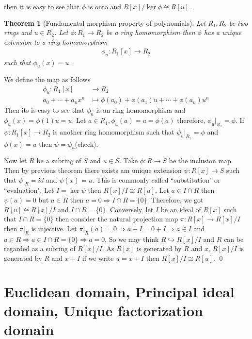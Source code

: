 \documentclass[11pt]{amsart}
\newtheorem{theorem}{Theorem}[section]
\begin{document}
then it is easy to see that $\phi$ is onto and $R[x]/\ker \phi\cong R[u].$ 
\begin{theorem}[Fundamental morphism property of polynomials]
Let $R_1,R_2$ be two rings and $u\in R_2$. Let $\phi:R_1\to R_2$ be a ring homomorphism then $\phi$ has a unique extension to a ring homomorphism \begin{align*}
\phi_u:R_1[x]\to R_2
\end{align*} such that $\phi_u(x)=u.$
\end{theorem}
\proof We define the map as follows \begin{align*}
\phi_u:R_1[x]&\to R_2\\
a_0+\cdots+a_nx^n&\mapsto \phi(a_0)+\phi(a_1)u+\cdots+\phi(a_n)u^n
\end{align*}
Then its is easy to see that $\phi_u$ is an ring homomorphism and $\phi_u(x)=\phi(1)u=u.$ Let $a\in R_1,\phi_u(a)=a=\phi(a)$ therefore, $\phi_u\big|_{R_1}=\phi.$ If $\psi:R_1[x]\to R_2$ is another ring homomorphism such that $\psi_u\big|_{R_1}=\phi$ and $\phi(x)=u$ then $\psi=\phi_u$(check).


 Now let $R$ be a subring of $S$ and $u\in S$. Take $\phi:R\to S$ be the inclusion map. Then by previous theorem there exists am unique extension $\psi: R[x]\to S$ such that $\psi\big|_R=id$ and $\psi(x)=u.$ This is commonly called ``substitution" or ``evaluation". Let $I=\ker \psi$ then $R[x]/I\cong R[u]$. Let $a\in I\cap R$ then $\psi(a)=0$ but $a\in R$ then $a=0 \Rightarrow I\cap R=\{0\}.$ Therefore, we got $R[u]\cong R[x]/I$ and $I\cap R=\{0\}.$ Conversely, let $I$ be an ideal of $R[x]$ such that $I\cap R=\{0\}$ then consider the natural projection map $\pi:R[x]\to R[x]/I$ then $\pi\big|_R$ is injective. Let $\pi\big|_R(a)=0 \Rightarrow a+I=0+I \Rightarrow a\in I$ and $a\in R\Rightarrow a\in I\cap R=\{0\} \Rightarrow a=0$. So we may think $R\hookrightarrow R[x]/I$ and $R$ can be regarded as a subring of $R[x]/I$. As $R[x]$ is generated by $R$ and $x$, $R[x]/I$ is generated by $R$ and $x+I$ if we write $u=x+I$ then $R[x]/I\cong R[u].$ \qed



\newpage
\section{Euclidean domain, Principal ideal domain, Unique factorization domain}
\end{document}
